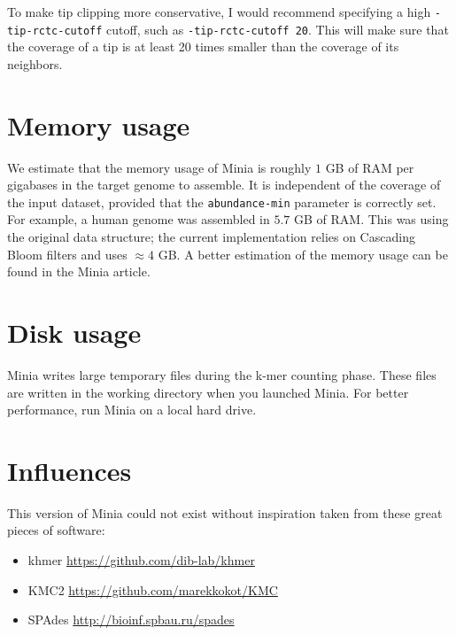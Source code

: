 \documentclass[a4paper]{article}
\begin{document}
To make tip clipping more conservative, I would recommend specifying a high \verb+-tip-rctc-cutoff+ cutoff, such as \verb+-tip-rctc-cutoff 20+. This will make sure that the coverage of a tip is at least 20 times smaller than the coverage of its neighbors.

\section{Memory usage}

We estimate that the memory usage of Minia is roughly $1$ GB of RAM per gigabases in the target genome to assemble. It is independent of the coverage of the input dataset, provided that the \verb!abundance-min! parameter is correctly set. For example, a human genome was assembled in $5.7$ GB of RAM. This was using the original data structure; the current implementation relies on Cascading Bloom filters and uses $\approx 4$ GB. A better estimation of the memory usage can be found in the Minia article.

\section{Disk usage}

Minia writes large temporary files during the k-mer counting phase. These files are written in the working directory when you launched Minia. For better performance, run Minia on a local hard drive. 

\section{Influences}

This version of Minia could not exist without inspiration taken from these great pieces of software:
\begin{itemize}
    \item khmer \url{https://github.com/dib-lab/khmer}
    \item KMC2 \url{https://github.com/marekkokot/KMC}
    \item SPAdes \url{http://bioinf.spbau.ru/spades}
\end{itemize}
\end{document}
